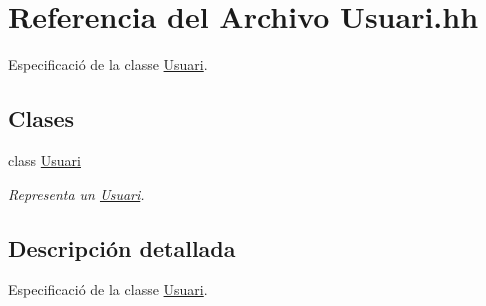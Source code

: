 \hypertarget{_usuari_8hh}{}\section{Referencia del Archivo Usuari.\+hh}
\label{_usuari_8hh}


Especificació de la classe \mbox{\hyperlink{class_usuari}{Usuari}}.  


\subsection*{Clases}
\begin{DoxyCompactItemize}
\item 
class \mbox{\hyperlink{class_usuari}{Usuari}}
\begin{DoxyCompactList}\small\item\em Representa un \mbox{\hyperlink{class_usuari}{Usuari}}. \end{DoxyCompactList}\end{DoxyCompactItemize}


\subsection{Descripción detallada}
Especificació de la classe \mbox{\hyperlink{class_usuari}{Usuari}}. 

